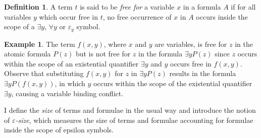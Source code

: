 \documentclass[10pt]{article}
\theoremstyle{definition}\newtheorem{remark}[theorem]{Remark}
\theoremstyle{definition}\newtheorem{example}[theorem]{Example}
\theoremstyle{definition}\newtheorem{definition}[theorem]{Definition}
\begin{document}
	\begin{definition}
		A term $t$ is said to be \textit{free for} a variable $x$ in a formula $A$ if for all variables $y$ which occur free in $t$, no free occurrence of $x$ in $A$ occurs inside the scope of a $\exists y$, $\forall y$ or $\varepsilon_y$ symbol.
	\end{definition}

	\begin{example}
		The term $f(x, y)$, where $x$ and $y$ are variables, is free for $z$ in the atomic formula $P(z)$ but is not free for $z$ in the formula $\exists y P(z)$ since $z$ occurs within the scope of an existential quantifier $\exists y$ and $y$ occurs free in $f(x, y)$. Observe that substituting $f(x, y)$ for $z$ in $\exists y P(z)$ results in the formula $\exists y P(f(x, y))$, in which $y$ occurs within the scope of the existential quantifier $\exists y$, causing a variable binding conflict.
	\end{example}
	
	I define the \textit{size} of terms and formulae in the usual way and introduce the notion of \textit{$\varepsilon$-size}, which measures the size of terms and formulae accounting for formulae inside the scope of epsilon symbols.
	
\end{document}
